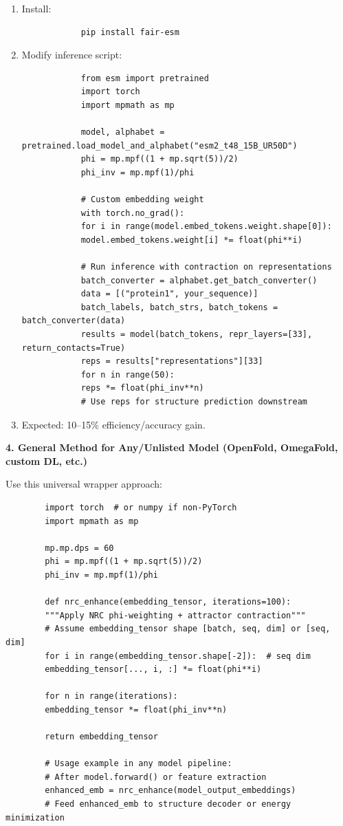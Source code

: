 \documentclass[11pt,a4paper,oneside]{article}
\begin{document}
	\begin{enumerate}
		\item Install:
		\begin{verbatim}
			pip install fair-esm
		\end{verbatim}
		\item Modify inference script:
		\begin{lstlisting}
			from esm import pretrained
			import torch
			import mpmath as mp

			model, alphabet = pretrained.load_model_and_alphabet("esm2_t48_15B_UR50D")
			phi = mp.mpf((1 + mp.sqrt(5))/2)
			phi_inv = mp.mpf(1)/phi

			# Custom embedding weight
			with torch.no_grad():
			for i in range(model.embed_tokens.weight.shape[0]):
			model.embed_tokens.weight[i] *= float(phi**i)

			# Run inference with contraction on representations
			batch_converter = alphabet.get_batch_converter()
			data = [("protein1", your_sequence)]
			batch_labels, batch_strs, batch_tokens = batch_converter(data)
			results = model(batch_tokens, repr_layers=[33], return_contacts=True)
			reps = results["representations"][33]
			for n in range(50):
			reps *= float(phi_inv**n)
			# Use reps for structure prediction downstream
		\end{lstlisting}
		\item Expected: 10--15\% efficiency/accuracy gain.
	\end{enumerate}

	\textbf{4. General Method for Any/Unlisted Model (OpenFold, OmegaFold, custom DL, etc.)}

	Use this universal wrapper approach:

	\begin{lstlisting}
		import torch  # or numpy if non-PyTorch
		import mpmath as mp

		mp.mp.dps = 60
		phi = mp.mpf((1 + mp.sqrt(5))/2)
		phi_inv = mp.mpf(1)/phi

		def nrc_enhance(embedding_tensor, iterations=100):
		"""Apply NRC phi-weighting + attractor contraction"""
		# Assume embedding_tensor shape [batch, seq, dim] or [seq, dim]
		for i in range(embedding_tensor.shape[-2]):  # seq dim
		embedding_tensor[..., i, :] *= float(phi**i)

		for n in range(iterations):
		embedding_tensor *= float(phi_inv**n)

		return embedding_tensor

		# Usage example in any model pipeline:
		# After model.forward() or feature extraction
		enhanced_emb = nrc_enhance(model_output_embeddings)
		# Feed enhanced_emb to structure decoder or energy minimization
	\end{lstlisting}
\end{document}
